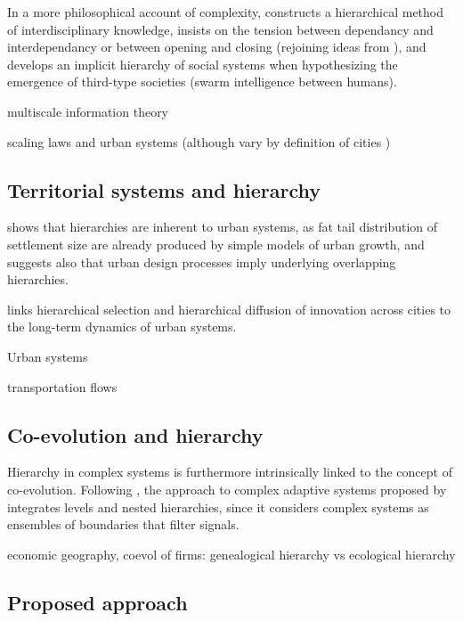 \documentclass[english,fleqn,allpages]{ISTE_science}[2018/07/30]
\begin{document}
In a more philosophical account of complexity, \cite{morin1980methode} constructs a hierarchical method of interdisciplinary knowledge, insists on the tension between dependancy and interdependancy or between opening and closing (rejoining ideas from \cite{holland2012signals}), and develops an implicit hierarchy of social systems when hypothesizing the emergence of third-type societies (swarm intelligence between humans).


\cite{allen2017multiscale} multiscale information theory

\cite{pumain2004scaling} scaling laws and urban systems (although vary by definition of cities \cite{cottineau2017diverse})


\subsection{Territorial systems and hierarchy}


\cite{batty2006hierarchy} shows that hierarchies are inherent to urban systems, as fat tail distribution of settlement size are already produced by simple models of urban growth, and suggests also that urban design processes imply underlying overlapping hierarchies.

\cite{pumain2006alternative} links hierarchical selection and hierarchical diffusion of innovation across cities to the long-term dynamics of urban systems.

Urban systems \cite{pumain2006hierarchy}


\cite{jiang2009street} transportation flows


\subsection{Co-evolution and hierarchy}



Hierarchy in complex systems is furthermore intrinsically linked to the concept of co-evolution. Following \cite{lane2006hierarchy}, the approach to complex adaptive systems proposed by \cite{holland2012signals} integrates levels and nested hierarchies, since it considers complex systems as ensembles of boundaries that filter signals. 

\cite{volberda2003co} economic geography, coevol of firms: genealogical hierarchy vs ecological hierarchy



\subsection{Proposed approach}
\end{document}
